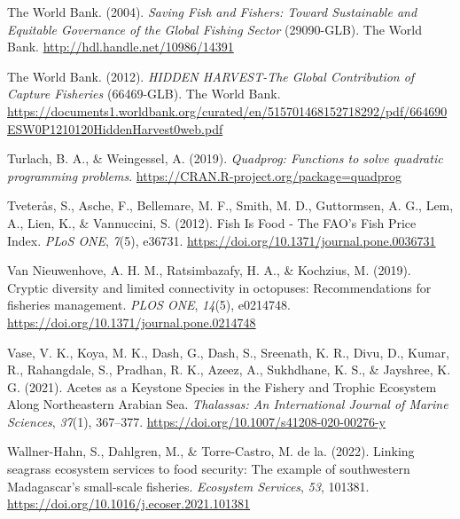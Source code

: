 \documentclass[
  12pt,
]{article}
\newlength{\cslhangindent}
\newlength{\cslentryspacingunit} %
\newenvironment{CSLReferences}[2] %
 {%
  \setlength{\parindent}{0pt}
  \ifodd #1
  \let\oldpar\par
  \def\par{\hangindent=\cslhangindent\oldpar}
  \fi
  \setlength{\parskip}{#2\cslentryspacingunit}
 }%
 {}
\begin{document}
\begin{CSLReferences}{1}{2}
\leavevmode{}%
The World Bank. (2004). \emph{Saving {Fish} and {Fishers}: {Toward} {Sustainable} and {Equitable} {Governance} of the {Global} {Fishing} {Sector}} (29090-GLB). The World Bank. \url{http://hdl.handle.net/10986/14391}

\leavevmode{}%
The World Bank. (2012). \emph{{HIDDEN} {HARVEST}-{The} {Global} {Contribution} of {Capture} {Fisheries}} (66469-GLB). The World Bank. \url{https://documents1.worldbank.org/curated/en/515701468152718292/pdf/664690ESW0P1210120HiddenHarvest0web.pdf}

\leavevmode{}%
Turlach, B. A., \& Weingessel, A. (2019). \emph{Quadprog: Functions to solve quadratic programming problems}. \url{https://CRAN.R-project.org/package=quadprog}

\leavevmode{}%
Tveterås, S., Asche, F., Bellemare, M. F., Smith, M. D., Guttormsen, A. G., Lem, A., Lien, K., \& Vannuccini, S. (2012). Fish {Is} {Food} - {The} {FAO}'s {Fish} {Price} {Index}. \emph{PLoS ONE}, \emph{7}(5), e36731. \url{https://doi.org/10.1371/journal.pone.0036731}

\leavevmode{}%
Van Nieuwenhove, A. H. M., Ratsimbazafy, H. A., \& Kochzius, M. (2019). Cryptic diversity and limited connectivity in octopuses: {Recommendations} for fisheries management. \emph{PLOS ONE}, \emph{14}(5), e0214748. \url{https://doi.org/10.1371/journal.pone.0214748}

\leavevmode{}%
Vase, V. K., Koya, M. K., Dash, G., Dash, S., Sreenath, K. R., Divu, D., Kumar, R., Rahangdale, S., Pradhan, R. K., Azeez, A., Sukhdhane, K. S., \& Jayshree, K. G. (2021). Acetes as a {Keystone} {Species} in the {Fishery} and {Trophic} {Ecosystem} {Along} {Northeastern} {Arabian} {Sea}. \emph{Thalassas: An International Journal of Marine Sciences}, \emph{37}(1), 367--377. \url{https://doi.org/10.1007/s41208-020-00276-y}

\leavevmode{}%
Wallner-Hahn, S., Dahlgren, M., \& Torre-Castro, M. de la. (2022). Linking seagrass ecosystem services to food security: {The} example of southwestern {Madagascar}'s small-scale fisheries. \emph{Ecosystem Services}, \emph{53}, 101381. \url{https://doi.org/10.1016/j.ecoser.2021.101381}


\end{CSLReferences}
\end{document}

